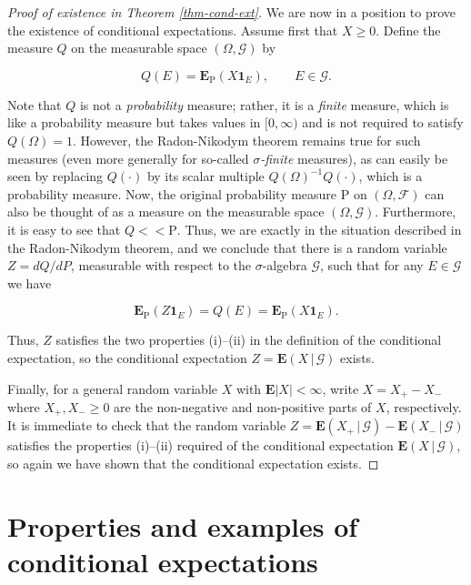 \begin{proof}[Proof of existence in Theorem \ref{thm-cond-ext}]
We are now in a position to prove the existence of
conditional expectations. Assume first that $X\ge 0$.
Define the measure $Q$ on the measurable space
$(\Omega, \mathcal{G})$ by

\[
Q(E) = \mathbf{E}_{\mathrm{P}}(X \mathbf{1}_E), \qquad E\in\mathcal{G}.
\]

\noindent Note that $Q$ is not a \emph{probability} measure; rather,
it is a \emph{finite} measure, which is like a probability
measure but takes values in $[0,\infty)$ and is not
required to satisfy $Q(\Omega)=1$. However, the
Radon-Nikodym theorem remains true for such measures
(even more generally for so-called \emph{$\sigma$-finite}
measures), as can easily be seen by replacing
$Q(\cdot)$ by its scalar multiple
$Q(\Omega)^{-1} Q(\cdot)$, which is a probability
measure. Now, the original probability measure
$\mathrm{P}$ on $(\Omega, \mathcal{F})$ can also be
thought of as a measure on the measurable space
$(\Omega, \mathcal{G})$. Furthermore, it is easy to
see that $Q << \mathrm{P}$. Thus, we are exactly in
the situation described in the Radon-Nikodym theorem,
and we conclude that there is a random variable
$Z=dQ/dP$, measurable with respect to the
$\sigma$-algebra $\mathcal{G}$, such that for any
$E\in\mathcal{G}$ we have

\[
\mathbf{E}_{\mathrm{P}}(Z \mathbf{1}_E) = Q(E) = \mathbf{E}_{\mathrm{P}}(X \mathbf{1}_E).
\]

\noindent Thus, $Z$ satisfies the two properties (i)--(ii) in
the definition of the conditional expectation, so the
conditional expectation
$Z=\mathbf{E}\left(X\,|\,\mathcal{G}\right)$ exists.

Finally, for a general random variable $X$ with
$\mathbf{E}|X|<\infty$, write $X=X_+-X_-$ where
$X_+, X_-\ge 0$ are the non-negative and non-positive
parts of $X$, respectively. It is immediate to check
that the random variable
$Z = \mathbf{E}\left(X_+\,|\,\mathcal{G}\right) -
\mathbf{E}\left(X_-\,|\,\mathcal{G}\right)$
satisfies the properties (i)--(ii) required of the
conditional expectation
$\mathbf{E}\left(X\,|\,\mathcal{G}\right)$, so again
we have shown that the conditional expectation exists.
\end{proof}

\section{Properties and examples of conditional expectations}

